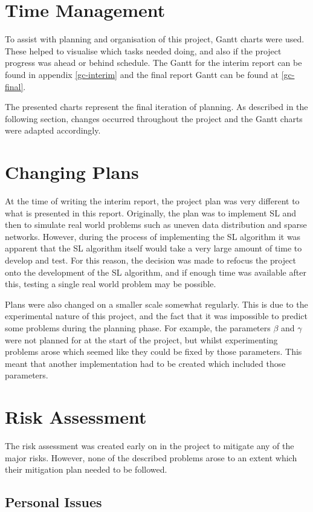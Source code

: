 \section{Time Management}
To assist with planning and organisation of this project, Gantt charts were used. These helped to visualise which tasks needed doing, and also if the project progress was ahead or behind schedule. The Gantt for the interim report can be found in appendix \ref{gc-interim} and the final report Gantt can be found at \ref{gc-final}.

The presented charts represent the final iteration of planning. As described in the following section, changes occurred throughout the project and the Gantt charts were adapted accordingly.

\section{Changing Plans}
At the time of writing the interim report, the project plan was very different to what is presented in this report. Originally, the plan was to implement SL and then to simulate real world problems such as uneven data distribution and sparse networks. However, during the process of implementing the SL algorithm it was apparent that the SL algorithm itself would take a very large amount of time to develop and test. For this reason, the decision was made to refocus the project onto the development of the SL algorithm, and if enough time was available after this, testing a single real world problem may be possible.

Plans were also changed on a smaller scale somewhat regularly. This is due to the experimental nature of this project, and the fact that it was impossible to predict some problems during the planning phase. For example, the parameters $\beta$ and $\gamma$ were not planned for at the start of the project, but whilst experimenting problems arose which seemed like they could be fixed by those parameters. This meant that another implementation had to be created which included those parameters.

\section{Risk Assessment}
The risk assessment was created early on in the project to mitigate any of the major risks. However, none of the described problems arose to an extent which their mitigation plan needed to be followed.
\subsection{Personal Issues}

